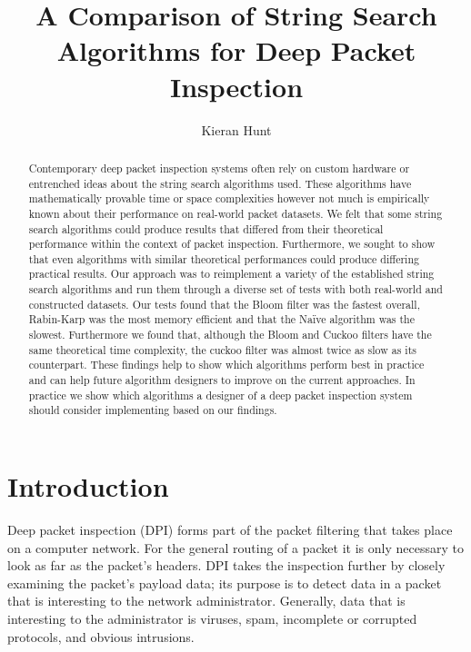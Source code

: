 \documentclass{article}
\begin{document}
\title{A Comparison of String Search Algorithms for Deep Packet Inspection}
\author{Kieran Hunt}

\maketitle

\begin{abstract}
Contemporary deep packet inspection systems often rely on custom hardware or entrenched ideas about the string search algorithms used. These algorithms have mathematically provable time or space complexities however not much is empirically known about their performance on real-world packet datasets. We felt that some string search algorithms could produce results that differed from their theoretical performance within the context of packet inspection. Furthermore, we sought to show that even algorithms with similar theoretical performances could produce differing practical results. Our approach was to reimplement a variety of the established string search algorithms and run them through a diverse set of tests with both real-world and constructed datasets. Our tests found that the Bloom filter was the fastest overall, Rabin-Karp was the most memory efficient and that the Naïve algorithm was the slowest. Furthermore we found that, although the Bloom and Cuckoo filters have the same theoretical time complexity, the cuckoo filter was almost twice as slow as its counterpart. These findings help to show which algorithms perform best in practice and can help future algorithm designers to improve on the current approaches. In practice we show which algorithms a designer of a deep packet inspection system should consider implementing based on our findings.
\end{abstract}

\section{Introduction}
Deep packet inspection (DPI) forms part of the packet filtering that takes place on a computer network. For the general routing of a packet it is only necessary to look as far as the packet's headers. DPI takes the inspection further by closely examining the packet's payload data; its purpose is to detect data in a packet that is interesting to the network administrator. Generally, data that is interesting to the administrator is viruses, spam, incomplete or corrupted protocols, and obvious intrusions.
\end{document}
